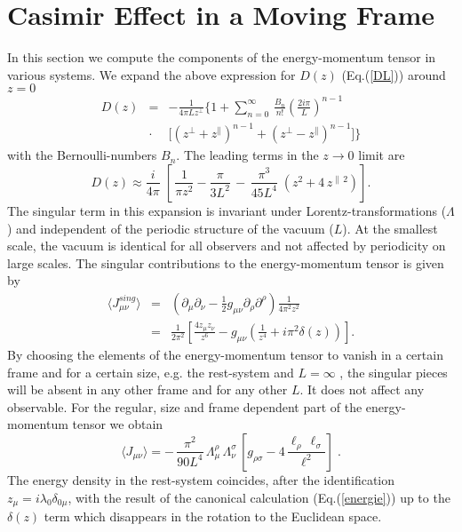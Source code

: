 \documentclass[a4paper,twocolumn,eqsecnum,aps]{revtex4}
\begin{document}
\section{Casimir Effect in a Moving Frame}
In this section we compute   the components of the energy-momentum tensor
in various systems.  We expand the 
above expression for $D(z)$ (Eq.(\ref{DL})) around $z=0$ 
\begin{eqnarray}
  \label{expa}
  D(z)& = &  -\frac{1}{4\pi L z^{\perp}}\Bigg\{ 1 + \sum^{\infty}_{n=0} \, \frac{B_{n}}{n !}
\left( \frac{2i\pi}{L}\right)^{n-1}\nonumber\\& \cdot& \bigg [\left ( z^{\perp} +  z^{\|} \right )^{n-1} +  \left (z^{\perp} -  z^{\|} \right ) ^{n-1} \bigg ]\Bigg\}
\end{eqnarray}
with the Bernoulli-numbers $B_{n}$. The leading terms in the $ z \rightarrow 0$ limit
are
$$
  D (z)\approx \frac{i}{4\pi} \; \left [ \, \frac{1}{\pi z^2} - \frac{\pi}{3 L^{2}}\, -
\, \frac{\pi^{3}}{45 L^{4}} \; \left ( z^{2} +4 \,z^{\|\, 2}\right ) \right ].
$$
The singular term in this expansion is invariant under Lorentz-transformations 
($\Lambda$) and independent of the periodic structure of the vacuum ($L$). At the smallest scale, 
the vacuum is identical for all observers and not affected by periodicity on large scales. The  
singular contributions to the energy-momentum tensor is given by 
\begin{eqnarray}
\label{sing}
 \langle J_{\mu\nu}^{sing}\rangle &=& 
(\partial_{\mu}\partial_{\nu}-\frac{1}{2}g_{\mu\nu}\partial_{\rho}\partial^{\rho})\frac{1}{4\pi^2 z^2} \nonumber\\ &=& 
\frac{1}{2\pi^2}\left[\frac{4z_{\mu}z_{\nu}}{z^6}-g_{\mu\nu}(\frac{1}{z^4}+i\pi^2\delta(z))\right].
\end{eqnarray}
By choosing the elements of the energy-momentum tensor to vanish in a certain frame 
and for a certain size, e.g. the rest-system and  $L=\infty$ , the singular pieces will be absent 
in any other frame and for any other $L$. It does not affect any observable. For the regular, size and frame dependent part of the energy-momentum tensor we obtain   
\begin{equation}
  \label{energy2}
\langle J_{\mu\nu}\rangle = - \,\frac{\pi^2}{90 L^4}\, \Lambda_{\mu}^{\rho} \,
\Lambda_{\nu}^{\sigma} \,\left[g_{\rho\sigma}-4 \,\frac{\ell _{\rho}\, \ell _{\sigma}}{\ell^2}\right]\; .\end{equation}
The energy density in the rest-system  coincides, after  the identification
 $z_{\mu}=i\lambda_{0}\delta_{0\mu}$, with the result of the canonical calculation (Eq.(\ref{energie})) 
 up to the $\delta(z)$ term which disappears in the rotation to the Euclidean space. 
\end{document}
